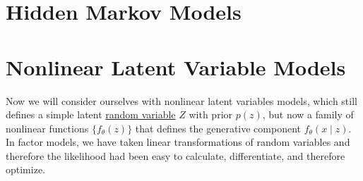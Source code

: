 \documentclass{article}
\begin{document}
\section{Hidden Markov Models}


\section{Nonlinear Latent Variable Models}

  Now we will consider ourselves with nonlinear latent variables models, which still defines a simple latent \hyperref[prob-def:random-variable]{random variable} $Z$ with prior $p(z)$, but now a family of nonlinear functions $\{f_\theta (z)\}$ that defines the generative component $f_\theta (x \mid z)$. In factor models, we have taken linear transformations of random variables and therefore the likelihood had been easy to calculate, differentiate, and therefore optimize. 
\end{document}
